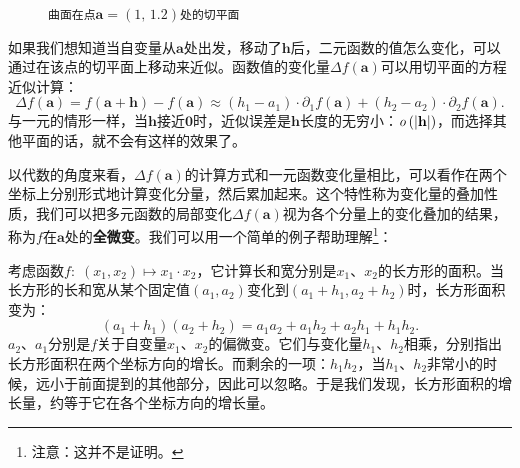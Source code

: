 \documentclass[12pt,UTF8]{ctexbook}
\begin{document}
\begin{figure}[h]
    \caption*{\texttt{曲面在点}$\mathbf{a}=(1,\,1.2)$\texttt{处的切平面}}
\end{figure}

如果我们想知道当自变量从$\mathbf{a}$处出发，移动了$\mathbf{h}$后，二元函数的值怎么变化，可以通过在该点的切平面上移动来近似。函数值的变化量$\Delta f(\mathbf{a})$可以用切平面的方程近似计算：
$$ \Delta f(\mathbf{a}) = f(\mathbf{a}+ \mathbf{h}) - f(\mathbf{a}) \approx (h_1 - a_1)\cdot\partial_1 f(\mathbf{a}) + (h_2 - a_2)\cdot\partial_2 f(\mathbf{a}). $$
与一元的情形一样，当$\mathbf{h}$接近$\mathbf{0}$时，近似误差是$\mathbf{h}$长度的无穷小：$\mathit{o}\left(|\mathbf{h}|\right)$，而选择其他平面的话，就不会有这样的效果了。

以代数的角度来看，$\Delta f(\mathbf{a})$的计算方式和一元函数变化量相比，可以看作在两个坐标上分别形式地计算变化分量，然后累加起来。这个特性称为变化量的叠加性质，我们可以把多元函数的局部变化$\Delta f(\mathbf{a})$视为各个分量上的变化叠加的结果，称为$f$在$\mathbf{a}$处的\textbf{全微变}。我们可以用一个简单的例子帮助理解\footnote{注意：这并不是证明。}：

考虑函数$f:\;(x_1, x_2) \mapsto x_1\cdot x_2$，它计算长和宽分别是$x_1$、$x_2$的长方形的面积。当长方形的长和宽从某个固定值$(a_1, a_2)$变化到$(a_1 + h_1, a_2 + h_2)$时，长方形面积变为：
$$(a_1 + h_1)(a_2 + h_2) = a_1a_2 + a_1 h_2 + a_2h_1 + h_1h_2.$$
$a_2$、$a_1$分别是$f$关于自变量$x_1$、$x_2$的偏微变。它们与变化量$h_1$、$h_2$相乘，分别指出长方形面积在两个坐标方向的增长。而剩余的一项：$h_1h_2$，当$h_1$、$h_2$非常小的时候，远小于前面提到的其他部分，因此可以忽略。于是我们发现，长方形面积的增长量，约等于它在各个坐标方向的增长量。
\end{document}
